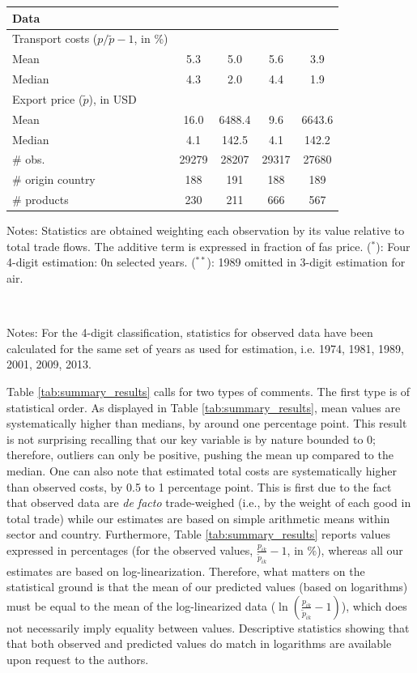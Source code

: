 \documentclass[a4paper,11pt]{article}
\begin{document}
\begin{table}[htbp]
{\begin{center}
\begin{tabular}{l|cc|cc}
    \multicolumn{5}{l}{\textbf{Data}  } \\ \hline
    Transport costs ($p/\widetilde{p} -1$, in \%) & & & & \\ \hline
    Mean & 5.3 & 5.0& 5.6&3.9 \\
    Median & 4.3 & 2.0 & 4.4& 1.9 \\ \hline
    Export price ($\widetilde{p}$), in USD & & & & \\
    Mean & 16.0 &	6488.4	&9.6	&6643.6 \\
    Median & 4.1	& 142.5	& 4.1	& 142.2 \\ \hline
    \# obs. & 29279 & 28207 & 29317 & 27680 \\
    \# origin country & 188 & 191 & 188 & 189 \\
    \# products & 230 & 211 & 666 & 567 \\  \hline \hline
  \end{tabular}
    \end{center}}
\parbox[l]{10cm}{\tiny{Notes: Statistics are obtained weighting each observation by its value relative to total trade flows. The additive term is expressed in fraction of fas price. ($^\ast$): Four 4-digit estimation: 0n selected years. ($^{\ast \ast}$): 1989 omitted in 3-digit estimation for air.}}\\
\parbox[l]{10cm}{\tiny{Notes: For the  4-digit classification, statistics for observed data have been calculated for the same set of years as used for estimation, i.e. 1974, 1981, 1989, 2001, 2009, 2013.}}
\end{table}%

Table \ref{tab:summary_results} calls for two types of comments. The first type is of statistical order. As displayed in Table \ref{tab:summary_results}, mean values are systematically higher than medians, by around one percentage point. This result is not surprising recalling that our key variable is by nature bounded to 0; therefore, outliers can only be positive, pushing the mean up compared to the median. One can also note that estimated total costs are systematically higher than observed costs, by 0.5 to 1 percentage point. This is first due to the fact that observed data are \textit{de facto} trade-weighed (i.e., by the weight of each good in total trade) while our estimates are based on simple arithmetic means within sector and country. Furthermore, Table \ref{tab:summary_results} reports values expressed in percentages (for the observed values, $\frac{p_{ik}}{\widetilde{p}_{ik}} -1$, in \%), whereas all our estimates are based on log-linearization. Therefore, what matters on the statistical ground is that the mean of our predicted values (based on logarithms) must be equal to the mean of the log-linearized data ($\ln\left(\frac{p_{ik}}{\widetilde{p}_{ik}}-1 \right)$), which does not necessarily imply equality between values. Descriptive statistics showing that that both observed and predicted values do match in logarithms are available upon request to the authors.\medskip
\end{document}

